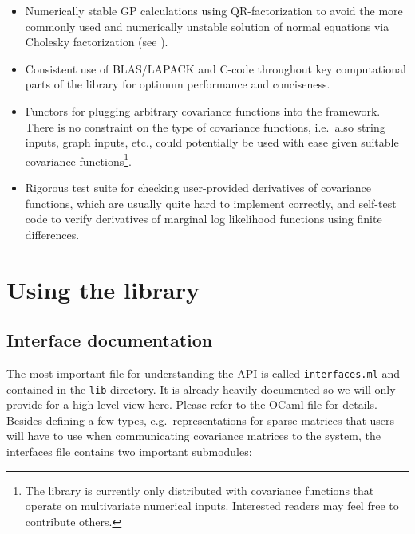 \documentclass[10pt]{report}
\begin{document}
\begin{itemize}
\item Numerically stable GP calculations using QR-factorization to avoid the
more commonly used and numerically unstable solution of normal equations via
Cholesky factorization (see \cite{Foster2009}).

\item Consistent use of BLAS/LAPACK and C-code throughout key computational
parts of the library for optimum performance and conciseness.

\item Functors for plugging arbitrary covariance functions into the framework.
There is no constraint on the type of covariance functions, i.e.\ also string
inputs, graph inputs, etc., could potentially be used with ease given suitable
covariance functions\footnote{The library is currently only distributed with
covariance functions that operate on multivariate numerical inputs.  Interested
readers may feel free to contribute others.}.

\item Rigorous test suite for checking user-provided derivatives of covariance
functions, which are usually quite hard to implement correctly, and self-test
code to verify derivatives of marginal log likelihood functions using finite
differences.

\end{itemize}

\chapter{Using the library}

\section{Interface documentation}

The most important file for understanding the API is called \verb=interfaces.ml=
and contained in the \verb=lib= directory.  It is already heavily documented so
we will only provide for a high-level view here.  Please refer to the OCaml file
for details.  Besides defining a few types, e.g.\ representations for sparse
matrices that users will have to use when communicating covariance matrices to
the system, the interfaces file contains two important submodules:
\end{document}
